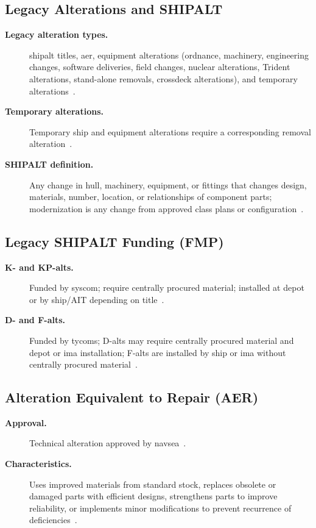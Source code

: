 \documentclass[../main.tex]{subfiles}
\begin{document}
\subsection{Legacy Alterations and SHIPALT}
\begin{description}
  \item[\textbf{Legacy alteration types.}] \ac{shipalt} titles, \ac{aer}, equipment alterations (ordnance, machinery, engineering changes, software deliveries, field changes, nuclear alterations, Trident alterations, stand-alone removals, crossdeck alterations), and temporary alterations~\autocite{edo-4-1-2-navy-modernization-2025}.
  \item[\textbf{Temporary alterations.}] Temporary ship and equipment alterations require a corresponding removal alteration~\autocite{edo-4-1-2-navy-modernization-2025}.
  \item[\textbf{SHIPALT definition.}] Any change in hull, machinery, equipment, or fittings that changes design, materials, number, location, or relationships of component parts; modernization is any change from approved class plans or configuration~\autocite{edo-4-1-2-navy-modernization-2025}.
\end{description}

\subsection{Legacy SHIPALT Funding (FMP)}
\begin{description}
  \item[\textbf{K- and KP-alts.}] Funded by \ac{syscom}; require centrally procured material; installed at depot or by ship/AIT depending on title~\autocite{edo-4-1-2-navy-modernization-2025}.
  \item[\textbf{D- and F-alts.}] Funded by \acp{tycom}; D-alts may require centrally procured material and depot or \ac{ima} installation; F-alts are installed by ship or \ac{ima} without centrally procured material~\autocite{edo-4-1-2-navy-modernization-2025}.
\end{description}

\subsection{Alteration Equivalent to Repair (AER)}
\begin{description}
  \item[\textbf{Approval.}] Technical alteration approved by \ac{navsea}~\autocite{edo-4-1-2-navy-modernization-2025}.
  \item[\textbf{Characteristics.}] Uses improved materials from standard stock, replaces obsolete or damaged parts with efficient designs, strengthens parts to improve reliability, or implements minor modifications to prevent recurrence of deficiencies~\autocite{edo-4-1-2-navy-modernization-2025}.
\end{description}
\end{document}
